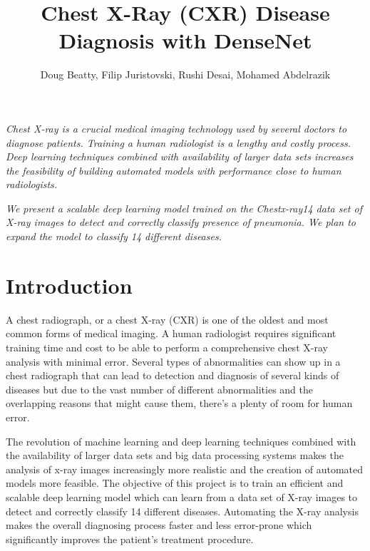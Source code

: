\documentclass{amia}
\begin{document}
\title{Chest X-Ray (CXR) Disease Diagnosis with DenseNet}

\author{Doug Beatty, Filip Juristovski, Rushi Desai, Mohamed Abdelrazik}


\maketitle


\textit{ Chest X-ray\cite{ref1} is a crucial medical imaging technology used by several doctors to diagnose patients. Training a human radiologist is a lengthy and costly process. Deep learning techniques combined with availability of larger data sets increases the feasibility of building automated models with  performance close to human radiologists.}

\textit{We present a scalable deep learning model trained on the Chestx-ray14 \cite{ref7} data set of X-ray images to detect and correctly classify presence of pneumonia. We plan to expand the model to classify 14 different diseases.}

\section*{Introduction}
A chest radiograph\cite{ref1}, or a chest X-ray (CXR) is one of the oldest and most common forms of medical imaging. A human radiologist requires significant training time and cost to be able to perform a comprehensive chest X-ray analysis with minimal error. Several types of abnormalities can show up in a chest radiograph that can lead to detection and diagnosis of several kinds of diseases but due to the vast number of different abnormalities and the overlapping reasons that might cause them, there’s a plenty of room for human error.

The revolution of machine learning and deep learning techniques combined with the availability of larger data sets\cite{ref2} and big data processing systems\cite{ref3} makes the analysis of x-ray images increasingly more realistic and the creation of automated models more feasible. The objective of this project is to train an efficient and scalable deep learning model which can learn from a data set of X-ray images to detect and correctly classify 14 different diseases. Automating the X-ray analysis makes the overall diagnosing process faster and less error-prone which significantly improves the patient’s treatment procedure.
\end{document}
